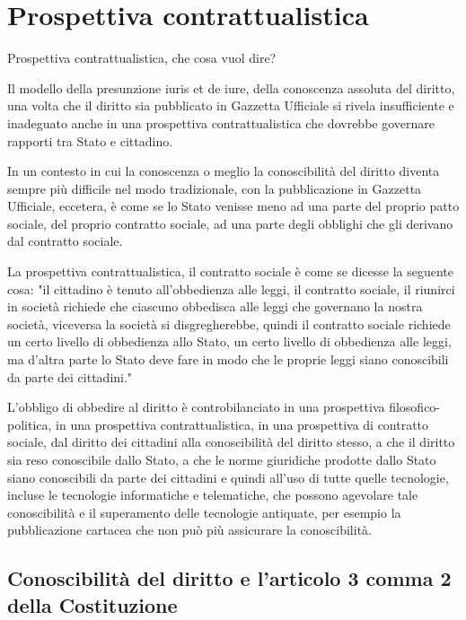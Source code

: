 \section{Prospettiva contrattualistica} %
Prospettiva contrattualistica, che cosa vuol dire? 

Il modello della presunzione iuris et de iure, della conoscenza assoluta del diritto, una volta che il diritto sia pubblicato in Gazzetta Ufficiale si rivela insufficiente e inadeguato anche in una prospettiva contrattualistica che dovrebbe governare rapporti tra Stato e cittadino. 

In un contesto in cui la conoscenza o meglio la conoscibilità del diritto diventa sempre più difficile nel modo tradizionale, con la pubblicazione in Gazzetta Ufficiale, eccetera, è come se lo Stato venisse meno ad una parte del proprio patto sociale, del proprio contratto sociale, ad una parte degli obblighi che gli derivano dal contratto sociale.

La prospettiva contrattualistica, il contratto sociale è come se dicesse la seguente cosa: "il cittadino è tenuto all'obbedienza alle leggi, il contratto sociale, il riunirci in società richiede che ciascuno obbedisca alle leggi che governano la nostra società, viceversa la società si disgregherebbe, quindi il contratto sociale richiede un certo livello di obbedienza allo Stato, un certo livello di obbedienza alle leggi, ma d'altra parte lo Stato deve fare in modo che le proprie leggi siano conoscibili da parte dei cittadini."

L'obbligo di obbedire al diritto è controbilanciato in una prospettiva filosofico-politica, in una prospettiva contrattualistica, in una prospettiva di contratto sociale, dal diritto dei cittadini alla conoscibilità del diritto stesso, a che il diritto sia reso conoscibile dallo Stato, a che le norme giuridiche prodotte dallo Stato siano conoscibili da parte dei cittadini e quindi all'uso di tutte quelle tecnologie, incluse le tecnologie informatiche e telematiche, che possono agevolare tale conoscibilità e il superamento delle tecnologie antiquate, per esempio la pubblicazione cartacea che non può più assicurare la conoscibilità.

\subsection{Conoscibilità del diritto e l'articolo 3 comma 2 della Costituzione}

